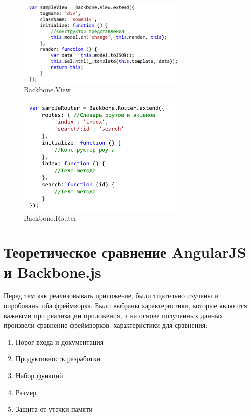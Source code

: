 \begin{figure}[ht]
\center\includegraphics[width=0.75\textwidth]{view}
\caption{Backbone.View}\label{view}
\end{figure}

\begin{figure}[ht]
\center\includegraphics[width=0.75\textwidth]{router}
\caption{Backbone.Router}\label{router}
\end{figure}

\section {Теоретическое сравнение AngularJS и Backbone.js}

Перед тем как реализовывать приложение, были тщательно изучены и опробованы оба фреймворка. Были выбраны характеристики, которые являются важными при реализации приложения, и на основе полученных данных произвели сравнение фреймворков. характеристики для сравнения:
\begin {enumerate}
\item Порог входа и документация
\item Продуктивность разработки
\item Набор функций
\item Размер 
\item Защита от утечки памяти 
\end {enumerate}

